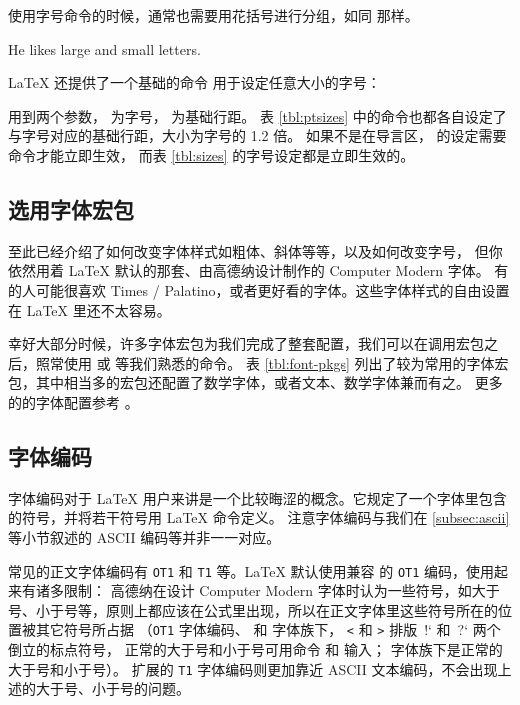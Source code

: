 使用字号命令的时候，通常也需要用花括号进行分组，如同  那样。
\begin{example}
He likes {\LARGE large and
{\small small} letters}.
\end{example}

\LaTeX{} 还提供了一个基础的命令  用于设定任意大小的字号：
\begin{command}
\end{command}

 用到两个参数， 为字号， 为基础行距。
表 \ref{tbl:ptsizes} 中的命令也都各自设定了与字号对应的基础行距，大小为字号的 1.2 倍。
如果不是在导言区， 的设定需要  命令才能立即生效，
而表 \ref{tbl:sizes} 的字号设定都是立即生效的。

\subsection{选用字体宏包}\label{subsec:font-pkgs}

至此已经介绍了如何改变字体样式如粗体、斜体等等，以及如何改变字号，
但你依然用着 \LaTeX{} 默认的那套、由高德纳设计制作的 Computer Modern 字体。
有的人可能很喜欢 Times / Palatino，或者更好看的字体。这些字体样式的自由设置在 \LaTeX{} 里还不太容易。

幸好大部分时候，许多字体宏包为我们完成了整套配置，我们可以在调用宏包之后，照常使用  或  等我们熟悉的命令。
表 \ref{tbl:font-pkgs} 列出了较为常用的字体宏包，其中相当多的宏包还配置了数学字体，或者文本、数学字体兼而有之。
更多的的字体配置参考 \cite{survey,fontcatalogue}。

\subsection{字体编码}\label{subsec:font-encs}

字体编码对于 \LaTeX{} 用户来讲是一个比较晦涩的概念。它规定了一个字体里包含的符号，并将若干符号用 \LaTeX{} 命令定义。
注意字体编码与我们在 \ref{subsec:ascii} 等小节叙述的 ASCII 编码等并非一一对应。

常见的正文字体编码有 \texttt{OT1} 和 \texttt{T1} 等。\LaTeX{} 默认使用兼容  的 \texttt{OT1} 编码，使用起来有诸多限制：
高德纳在设计 Computer Modern 字体时认为一些符号，如大于号、小于号等，原则上都应该在公式里出现，所以在正文字体里这些符号所在的位置被其它符号所占据
（\texttt{OT1} 字体编码、 和  字体族下， \texttt< 和 \texttt> 排版\ !` 和\ ?` 两个倒立的标点符号，
正常的大于号和小于号可用命令  和  输入； 字体族下是正常的大于号和小于号）。
扩展的 \texttt{T1} 字体编码则更加靠近 ASCII 文本编码，不会出现上述的大于号、小于号的问题。

